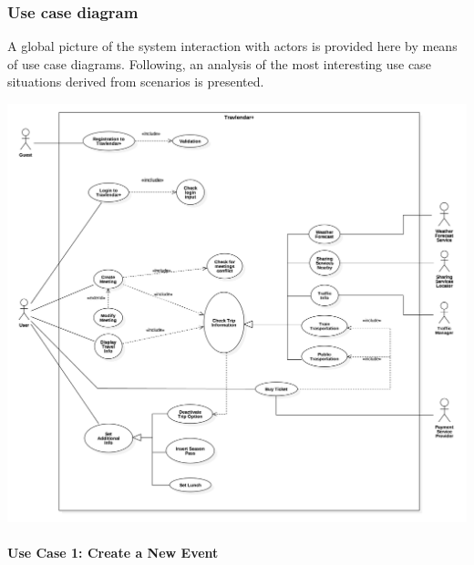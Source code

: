 \subsubsection{Use case diagram}
	A global picture of the system interaction with actors is provided here by means of use case diagrams. Following, an analysis of the most interesting use case situations derived from scenarios is presented.

	\includegraphics[width=\textwidth]{img/uml/useCase.png}

	\paragraph{Use Case 1: Create a New Event}
	
